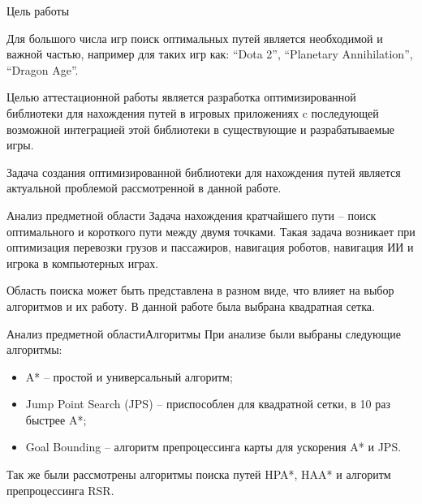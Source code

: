 \documentclass{beamer}
\begin{document}
\begin{frame}
  
  \vfill
  
\end{frame}

\justify

\begin{frame}{Цель работы}

    Для большого числа игр поиск оптимальных путей является необходимой и важной частью, например для таких игр как: ``Dota 2'', ``Planetary Annihilation'', ``Dragon Age''.
    
    \vspace{\baselineskip}
    
    Целью аттестационной работы является разработка оптимизированной библиотеки для нахождения путей в игровых приложениях c последующей возможной интеграцией этой библиотеки в существующие и разрабатываемые игры.
    
    \vspace{\baselineskip}
    
    Задача создания оптимизированной библиотеки для нахождения путей является актуальной проблемой рассмотренной в данной работе.
\end{frame}

\begin{frame}{Анализ предметной области}
    Задача нахождения кратчайшего пути -- поиск оптимального и короткого пути между двумя точками. Такая задача возникает при оптимизация перевозки грузов и пассажиров, навигация роботов, навигация ИИ и игрока в компьютерных играх.
    
        \vspace{\baselineskip}
        
    Область поиска может быть представлена в разном виде, что влияет на выбор алгоритмов и их работу. В данной работе была выбрана квадратная сетка.
\end{frame}


\begin{frame}{Анализ предметной области}{Алгоритмы}
    При анализе были выбраны следующие алгоритмы:
    
    \begin{itemize}
        \item A* -- простой и универсальный алгоритм;
        \item Jump Point Search (JPS) -- приспособлен для квадратной сетки, в 10 раз быстрее A*;
        \item Goal Bounding -- алгоритм препроцессинга карты для ускорения A* и JPS.
    \end{itemize}
    
    Так же были рассмотрены алгоритмы поиска путей HPA*, HAA* и алгоритм препроцессинга RSR.
\end{frame}
\end{document}
